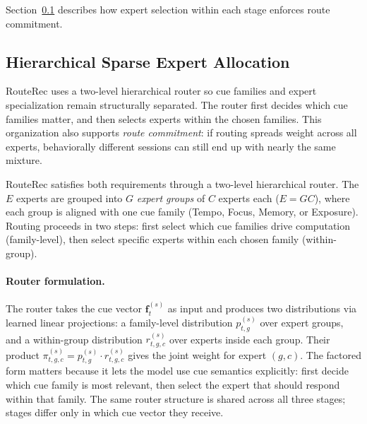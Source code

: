 \documentclass[sigconf,review,anonymous]{acmart}
\begin{document}
Section~\ref{sec:hierarchical-routing} describes how expert selection within each stage enforces route commitment.



\subsection{Hierarchical Sparse Expert Allocation}
\label{sec:hierarchical-routing}

RouteRec uses a two-level hierarchical router so cue families and expert specialization remain structurally separated. The router first decides which cue families matter, and then selects experts within the chosen families. This organization also supports \emph{route commitment}: if routing spreads weight across all experts, behaviorally different sessions can still end up with nearly the same mixture.

RouteRec satisfies both requirements through a two-level hierarchical router. The $E$ experts are grouped into $G$ \emph{expert groups} of $C$ experts each ($E = GC$), where each group is aligned with one cue family (Tempo, Focus, Memory, or Exposure). Routing proceeds in two steps: first select which cue families drive computation (family-level), then select specific experts within each chosen family (within-group).

\paragraph{Router formulation.}
The router takes the cue vector $\mathbf{f}^{(s)}_t$ as input and produces two distributions via learned linear projections: a family-level distribution $p^{(s)}_{t,g}$ over expert groups, and a within-group distribution $r^{(s)}_{t,g,c}$ over experts inside each group. Their product $\pi^{(s)}_{t,g,c} = p^{(s)}_{t,g} \cdot r^{(s)}_{t,g,c}$ gives the joint weight for expert $(g,c)$. The factored form matters because it lets the model use cue semantics explicitly: first decide which cue family is most relevant, then select the expert that should respond within that family. The same router structure is shared across all three stages; stages differ only in which cue vector they receive.
\end{document}
